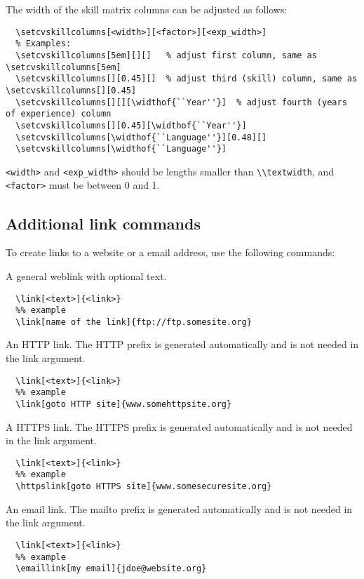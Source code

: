 \documentclass[a4paper, 11pt]{article}
\newcommand{\code}[1]{\lstinline!#1!}
\begin{document}
The width of the skill matrix columns can be adjusted as follows:
\begin{lstlisting}
  \setcvskillcolumns[<width>][<factor>][<exp_width>]
  % Examples:
  \setcvskillcolumns[5em][][]   % adjust first column, same as \setcvskillcolumns[5em]
  \setcvskillcolumns[][0.45][]  % adjust third (skill) column, same as \setcvskillcolumns[][0.45]
  \setcvskillcolumns[][][\widthof{``Year''}]  % adjust fourth (years of experience) column
  \setcvskillcolumns[][0.45][\widthof{``Year''}]
  \setcvskillcolumns[\widthof{``Language''}][0.48][]
  \setcvskillcolumns[\widthof{``Language''}]
\end{lstlisting}
\code{<width>} and \code{<exp_width>} should be lengths smaller than \code{\\textwidth}, and \code{<factor>} must be between 0 and 1.

\subsection{Additional link commands}%
To create links to a website or a email address, use the following commands:

A general weblink with optional text.  
\begin{lstlisting}
  \link[<text>]{<link>}
  %% example
  \link[name of the link]{ftp://ftp.somesite.org}
\end{lstlisting}

An HTTP link. The HTTP prefix is generated automatically and is not needed in the link argument.
\begin{lstlisting}
  \link[<text>]{<link>}
  %% example
  \link[goto HTTP site]{www.somehttpsite.org}
\end{lstlisting}

A HTTPS link. The HTTPS prefix is generated automatically and is not needed in the link argument.
\begin{lstlisting}
  \link[<text>]{<link>}
  %% example
  \httpslink[goto HTTPS site]{www.somesecuresite.org}
\end{lstlisting}

An email link. The mailto prefix is generated automatically and is not needed in the link argument.
\begin{lstlisting}
  \link[<text>]{<link>}
  %% example
  \emaillink[my email]{jdoe@website.org}
\end{lstlisting}
\end{document}
